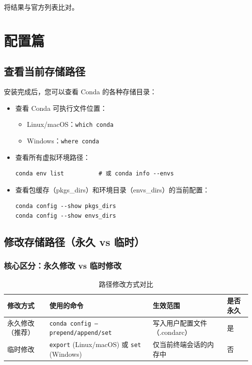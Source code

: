\documentclass[12pt,UTF8]{ctexbook}
\begin{document}
将结果与官方列表比对。

\part{配置篇}

\chapter{查看当前存储路径}
\label{chap:view_paths}

安装完成后，您可以查看 Conda 的各种存储目录：

\begin{itemize}[leftmargin=2cm]
    \item 查看 Conda 可执行文件位置：
        \begin{itemize}[leftmargin=1cm]
            \item Linux/macOS：\texttt{which conda}
            \item Windows：\texttt{where conda}
        \end{itemize}
    \item 查看所有虚拟环境路径：
        \begin{lstlisting}
conda env list          # 或 conda info --envs
        \end{lstlisting}
    \item 查看包缓存（pkgs\_dirs）和环境目录（envs\_dirs）的当前配置：
        \begin{lstlisting}
conda config --show pkgs_dirs
conda config --show envs_dirs
        \end{lstlisting}
\end{itemize}

\chapter{修改存储路径（永久 vs 临时）}
\label{chap:modify_paths}

\section{核心区分：永久修改 vs 临时修改}
\label{sec:path_modification_types}

\begin{table}[htbp]
    \centering
    \caption{路径修改方式对比}
    \begin{tabular}{|p{3cm}|p{4cm}|p{3.5cm}|p{2cm}|}
        \hline
        \textbf{修改方式} & \textbf{使用的命令} & \textbf{生效范围} & \textbf{是否永久} \\
        \hline
        永久修改（推荐） & \texttt{conda config --prepend/append/set} & 写入用户配置文件（.condarc） & 是 \\
        \hline
        临时修改 & \texttt{export} (Linux/macOS) 或 \texttt{set} (Windows) & 仅当前终端会话的内存中 & 否 \\
        \hline
    \end{tabular}
\end{table}
\end{document}
